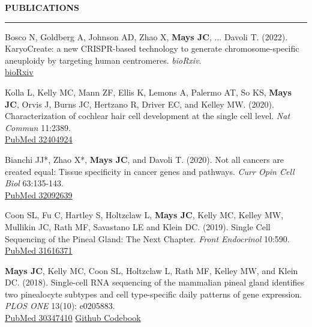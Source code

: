 \documentclass[10pt, letterpaper]{article} %
\newenvironment{CVSection}{
\begin{addmargin}[2em]{0em}
\begin{samepage}}
{\end{samepage}
\end{addmargin}\bigskip}
\newcommand{\CVHeading}[1]{
\MakeUppercase{\bf #1}
\smallskip
\hrule
\medskip
}
\begin{document}


\CVHeading{Publications}
\begin{CVSection}
Bosco N, Goldberg A, Johnson AD, Zhao X, \textbf{Mays JC}, ... Davoli T. (2022). KaryoCreate: a new CRISPR-based technology to generate chromosome-specific aneuploidy by targeting human centromeres. \emph{bioRxiv}.\\
\hspace{2 in}\href{https://doi.org/10.1101/2022.09.27.509580}{\faExternalLink\hspace{1mm}bioRxiv}\medskip

Kolla L, Kelly MC, Mann ZF, Ellis K, Lemons A, Palermo AT, So KS, \textbf{Mays JC}, Orvis J, Burns JC, Hertzano R, Driver EC, and Kelley MW. (2020). Characterization of cochlear hair cell development at the single cell level. \emph{Nat Commun} 11:2389.\\
\hspace{2 in}\href{https://www.ncbi.nlm.nih.gov/pubmed/32404924}{\faFileTextO\hspace{1mm}PubMed 32404924}\medskip

Bianchi JJ*, Zhao X*, \textbf{Mays JC}, and Davoli T. (2020). Not all cancers are created equal: Tissue specificity in cancer genes and pathways. \emph{Curr Opin Cell Biol} 63:135-143.\\
\hspace{2 in}\href{https://www.ncbi.nlm.nih.gov/pubmed/32092639}{\faFileTextO\hspace{1mm}PubMed 32092639}\medskip

Coon SL, Fu C, Hartley S, Holtzclaw L, \textbf{Mays JC}, Kelly MC, Kelley MW, Mullikin JC, Rath MF, Savastano LE and Klein DC. (2019). Single Cell Sequencing of the Pineal Gland: The Next Chapter. \emph{Front Endocrinol} 10:590.\\
\hspace{2 in}\href{https://www.ncbi.nlm.nih.gov/pubmed/31616371}{\faFileTextO\hspace{1mm}PubMed 31616371}\medskip

\textbf{Mays JC}, Kelly MC, Coon SL, Holtzclaw L, Rath MF, Kelley MW, and Klein DC. (2018). Single-cell RNA sequencing of the mammalian pineal gland identifies two pinealocyte subtypes and cell type-specific daily patterns of gene expression. \emph{PLOS ONE} 13(10): e0205883.\\
\hspace{2 in}\href{https://www.ncbi.nlm.nih.gov/pubmed/30347410}{\faFileTextO\hspace{1mm}PubMed 30347410}
\hspace{2mm}\href{https://github.com/joeymays/PinealGland_SingleCell}{\faCode\hspace{1mm}Github Codebook}\medskip
\end{CVSection}
\end{document}

